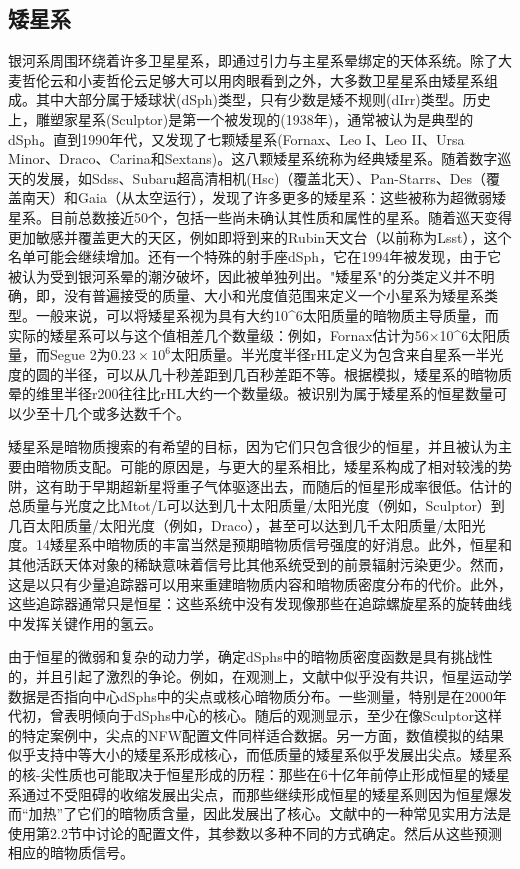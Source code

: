 \subsection{矮星系} 

银河系周围环绕着许多卫星星系，即通过引力与主星系晕绑定的天体系统。除了大麦哲伦云和小麦哲伦云足够大可以用肉眼看到之外，大多数卫星星系由矮星系组成。其中大部分属于矮球状(dSph)类型，只有少数是矮不规则(dIrr)类型。历史上，雕塑家星系(Sculptor)是第一个被发现的(1938年)，通常被认为是典型的dSph。直到1990年代，又发现了七颗矮星系(Fornax、Leo I、Leo II、Ursa Minor、Draco、Carina和Sextans)。这八颗矮星系统称为经典矮星系。随着数字巡天的发展，如Sdss、Subaru超高清相机(Hsc)（覆盖北天）、Pan-Starrs、Des（覆盖南天）和Gaia（从太空运行），发现了许多更多的矮星系：这些被称为超微弱矮星系。目前总数接近50个，包括一些尚未确认其性质和属性的星系。随着巡天变得更加敏感并覆盖更大的天区，例如即将到来的Rubin天文台（以前称为Lsst），这个名单可能会继续增加。还有一个特殊的射手座dSph，它在1994年被发现，由于它被认为受到银河系晕的潮汐破坏，因此被单独列出。"矮星系"的分类定义并不明确，即，没有普遍接受的质量、大小和光度值范围来定义一个小星系为矮星系类型。一般来说，可以将矮星系视为具有大约10^6太阳质量的暗物质主导质量，而实际的矮星系可以与这个值相差几个数量级：例如，Fornax估计为56×10^6太阳质量，而Segue 2为$0.23\times 10^6$太阳质量。半光度半径rHL定义为包含来自星系一半光度的圆的半径，可以从几十秒差距到几百秒差距不等。根据模拟，矮星系的暗物质晕的维里半径r200往往比rHL大约一个数量级。被识别为属于矮星系的恒星数量可以少至十几个或多达数千个。

矮星系是暗物质搜索的有希望的目标，因为它们只包含很少的恒星，并且被认为主要由暗物质支配。可能的原因是，与更大的星系相比，矮星系构成了相对较浅的势阱，这有助于早期超新星将重子气体驱逐出去，而随后的恒星形成率很低。估计的总质量与光度之比Mtot/L可以达到几十太阳质量/太阳光度（例如，Sculptor）到几百太阳质量/太阳光度（例如，Draco），甚至可以达到几千太阳质量/太阳光度。14矮星系中暗物质的丰富当然是预期暗物质信号强度的好消息。此外，恒星和其他活跃天体对象的稀缺意味着信号比其他系统受到的前景辐射污染更少。然而，这是以只有少量追踪器可以用来重建暗物质内容和暗物质密度分布的代价。此外，这些追踪器通常只是恒星：这些系统中没有发现像那些在追踪螺旋星系的旋转曲线中发挥关键作用的氢云。

由于恒星的微弱和复杂的动力学，确定dSphs中的暗物质密度函数是具有挑战性的，并且引起了激烈的争论。例如，在观测上，文献中似乎没有共识，恒星运动学数据是否指向中心dSphs中的尖点或核心暗物质分布。一些测量，特别是在2000年代初，曾表明倾向于dSphs中心的核心。随后的观测显示，至少在像Sculptor这样的特定案例中，尖点的NFW配置文件同样适合数据。另一方面，数值模拟的结果似乎支持中等大小的矮星系形成核心，而低质量的矮星系似乎发展出尖点。矮星系的核-尖性质也可能取决于恒星形成的历程：那些在6十亿年前停止形成恒星的矮星系通过不受阻碍的收缩发展出尖点，而那些继续形成恒星的矮星系则因为恒星爆发而“加热”了它们的暗物质含量，因此发展出了核心。文献中的一种常见实用方法是使用第2.2节中讨论的配置文件，其参数以多种不同的方式确定。然后从这些预测相应的暗物质信号。

